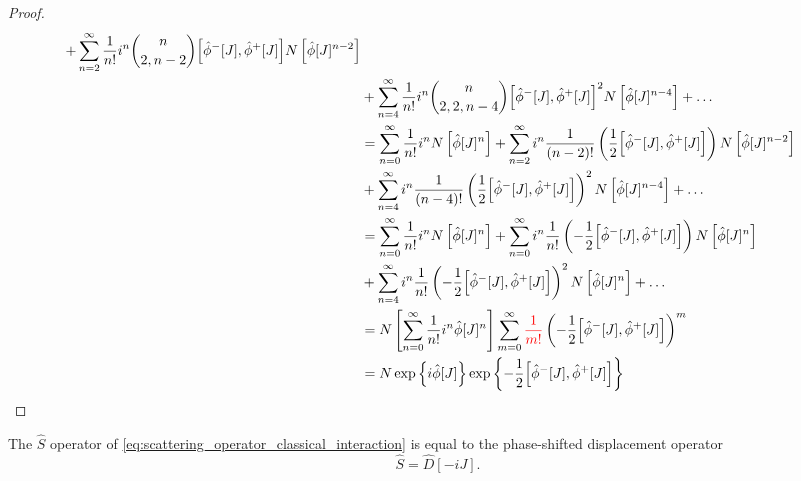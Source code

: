 \begin{proof}
\begin{equation*}
\begin{split}
			+
			\sum_{n=2}^\infty
			\frac{1}{n!}
			i^n
			\binom{n}{2,n-2}
			\comm{\hat\phi^-[J]}{\hat\phi^+[J]}
			N\left[\hat\phi[J]^{n-2}\right]
			\\
			&+
			\sum_{n=4}^\infty
			\frac{1}{n!}
			i^n
			\binom{n}{2,2,n-4}
			\comm{\hat\phi^-[J]}{\hat\phi^+[J]}^2
			N\left[\hat\phi[J]^{n-4}\right]
			+
			\dots
			\\
			&=
			\sum_{n=0}^\infty
			\frac{1}{n!}
			i^n
			N\left[\hat\phi[J]^n\right]
			+
			\sum_{n=2}^\infty
			i^n
			\frac{1}{(n-2)!}
			\left(
				\frac{1}{2}
				\comm{\hat\phi^-[J]}{\hat\phi^+[J]}
			\right)
			N\left[\hat\phi[J]^{n-2}\right]
			\\
			&+
			\sum_{n=4}^\infty
			i^n
			\frac{1}{(n-4)!}
			\left(
				\frac{1}{2}
				\comm{\hat\phi^-[J]}{\hat\phi^+[J]}
			\right)^2
			N\left[\hat\phi[J]^{n-4}\right]
			+
			\dots
			\\
			&=
			\sum_{n=0}^\infty
			\frac{1}{n!}
			i^n
			N\left[\hat\phi[J]^n\right]
			+
			\sum_{n=0}^\infty
			i^n
			\frac{1}{n!}
			\left(
				-
				\frac{1}{2}
				\comm{\hat\phi^-[J]}{\hat\phi^+[J]}
			\right)
			N\left[\hat\phi[J]^n\right]
			\\
			&+
			\sum_{n=4}^\infty
			i^n
			\frac{1}{n!}
			\left(
				-
				\frac{1}{2}
				\comm{\hat\phi^-[J]}{\hat\phi^+[J]}
			\right)^2
			N\left[\hat\phi[J]^n\right]
			+
			\dots
			\\
			&=
			N\left[
				\sum_{n=0}^\infty
				\frac{1}{n!}
				i^n
				\hat\phi[J]^n
			\right]
			\sum_{m=0}^\infty
			\textcolor{red}{\frac{1}{m!}}
			\left(
				-
				\frac{1}{2}
				\comm{\hat\phi^-[J]}{\hat\phi^+[J]}
			\right)^m
			\\
			&=
			N\exp\left\{
				i
				\hat\phi[J]
			\right\}
			\exp\left\{
				-
				\frac{1}{2}
				\comm{\hat\phi^-[J]}{\hat\phi^+[J]}
			\right\}
		\end{split}
	\end{equation*}
\end{proof}
\begin{theorem}\label{thm:displacement_scattering_operator_equivalence}
	The $\hat{S}$ operator of \cref{eq:scattering_operator_classical_interaction} is equal to the phase-shifted displacement operator
	\begin{equation}
		\hat{S}
		=
		\hat{D}[-iJ]
		.
	\end{equation}
\end{theorem}

